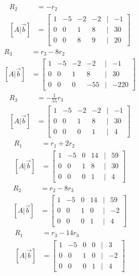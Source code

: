 \documentclass{article}
\begin{document}
\begin{align*}
	R_2 & = -r_2 \\
	[A|\vec{b}] & = \begin{bmatrix}
		1 & -5 & -2 & -2 & | & -1 \\
		0 & 0 & 1 & 8 & | & 30 \\
		0 & 0 & 8 & 9 & | & 20
	\end{bmatrix}
\end{align*}
\begin{align*}
	R_3 & = r_3 - 8r_2 \\
	[A|\vec{b}] & = \begin{bmatrix}
		1 & -5 & -2 & -2 & | & -1 \\
		0 & 0 & 1 & 8 & | & 30 \\
		0 & 0 & 0 & -55 & | & -220
	\end{bmatrix}
\end{align*}
\begin{align*}
	R_3 & = -\frac{1}{55}r_3 \\
	[A|\vec{b}] & = \begin{bmatrix}
		1 & -5 & -2 & -2 & | & -1 \\
		0 & 0 & 1 & 8 & | & 30 \\
		0 & 0 & 0 & 1 & | & 4
	\end{bmatrix}
\end{align*}
\begin{align*}
	R_1 & = r_1 + 2r_2 \\
	[A|\vec{b}] & = \begin{bmatrix}
		1 & -5 & 0 & 14 & | & 59 \\
		0 & 0 & 1 & 8 & | & 30 \\
		0 & 0 & 0 & 1 & | & 4
	\end{bmatrix}
\end{align*}
\begin{align*}
	R_2 & = r_2 - 8r_3 \\
	[A|\vec{b}] & = \begin{bmatrix}
		1 & -5 & 0 & 14 & | & 59 \\
		0 & 0 & 1 & 0 & | & -2 \\
		0 & 0 & 0 & 1 & | & 4
	\end{bmatrix}
\end{align*}
\begin{align*}
	R_1 & = r_3 - 14r_3 \\
	[A|\vec{b}] & = \begin{bmatrix}
		1 & -5 & 0 & 0 & | & 3 \\
		0 & 0 & 1 & 0 & | & -2 \\
		0 & 0 & 0 & 1 & | & 4
	\end{bmatrix}
\end{align*}
\end{document}
